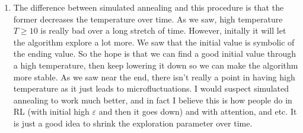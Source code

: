 \documentclass[12pt]{article}
\begin{document}
\begin{enumerate}[label=(\alph*)]
        \item The difference between simulated annealing and this procedure is that the former decreases the temperature over time. As we saw, high temperature $T \geq 10$ is really bad over a long stretch of time. However, initally it will let the algorithm explore a lot more. We saw that the initial value is symbolic of the ending value. So the hope is that we can find a good initial value through a high temperature, then keep lowering it down so we can make the algorithm more stable. As we saw near the end, there isn't really a point in having high temperature as it just leads to microfluctuations. I would suspect simulated annealing to work much better, and in fact I believe this is how people do in RL (with initial high $\varepsilon$ and then it goes down) and with attention, and etc. It is just a good idea to shrink the exploration parameter over time.
    \end{enumerate}
\end{document}
